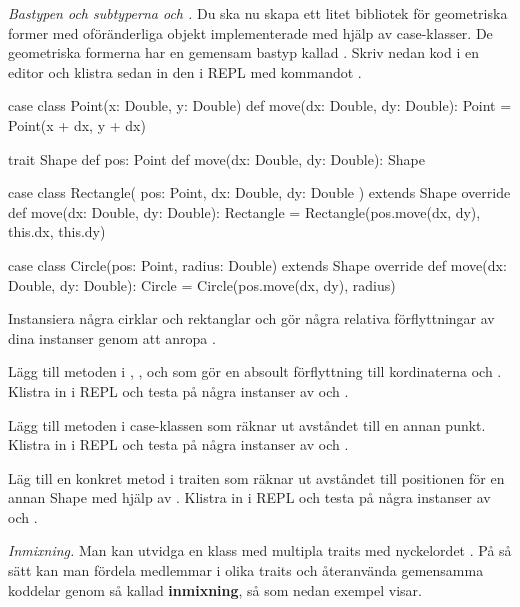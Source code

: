 \Task \emph{Bastypen  och subtyperna  och .} Du ska nu skapa ett litet bibliotek för geometriska former med oföränderliga objekt implementerade med hjälp av case-klasser. De geometriska formerna har en gemensam bastyp kallad . Skriv nedan kod i en editor och klistra sedan in den i REPL med kommandot .
\begin{Code}
case class Point(x: Double, y: Double) {
  def move(dx: Double, dy: Double): Point = Point(x + dx, y + dx)
}

trait Shape {
  def pos: Point
  def move(dx: Double, dy: Double): Shape
}

case class Rectangle(
  pos: Point, 
  dx: Double,
  dy: Double
) extends Shape {
  override def move(dx: Double, dy: Double): Rectangle = 
    Rectangle(pos.move(dx, dy), this.dx, this.dy)
}

case class Circle(pos: Point, radius: Double) extends Shape {
  override def move(dx: Double, dy: Double): Circle = 
    Circle(pos.move(dx, dy), radius)
}
\end{Code}

\Subtask Instansiera några cirklar och rektanglar och gör några relativa förflyttningar av dina instanser genom att anropa . 

\Subtask Lägg till metoden  i , ,  och  som gör en absoult förflyttning till kordinaterna  och . Klistra in i REPL och testa på några instanser av  och .

\Subtask Lägg till metoden  i case-klassen  som räknar ut avståndet till en annan punkt. Klistra in i REPL och testa på några instanser av  och .

\Subtask Läg till en konkret metod  i traiten  som räknar ut avståndet till positionen för en annan Shape med hjälp av . Klistra in i REPL och testa på några instanser av  och .

 





\Task \label{task:fyle} \emph{Inmixning.} Man kan utvidga en klass med multipla traits med nyckelordet . På så sätt kan man fördela medlemmar i olika traits och återanvända gemensamma koddelar genom så kallad \textbf{inmixning}, så som nedan exempel visar. 

